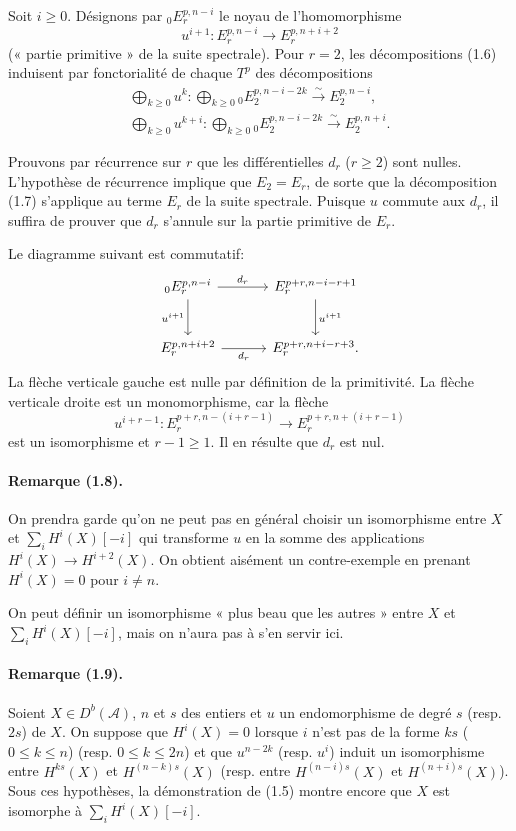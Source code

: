 \documentclass[10pt]{article}
\newcommand{\Acal}{\mathcal A}
\newcommand{\Db}{D^b}
\newcommand{\iso}{\xrightarrow{\sim}}
\begin{document}
Soit $i\ge0$. Désignons par ${}_0E_r^{p,n-i}$ le noyau de l'homomorphisme
\[
u^{i+1}:E_r^{p,n-i}\longrightarrow E_r^{p,n+i+2}
\]
(« partie primitive » de la suite spectrale). Pour $r=2$, les décompositions (1.6) induisent par fonctorialité de chaque $T^p$ des décompositions
\[
\tag{1.7}
\begin{gathered}
\bigoplus_{k\ge0}u^k:\bigoplus_{k\ge0}{}_0E_2^{p,n-i-2k}\iso E_2^{p,n-i},\\
\bigoplus_{k\ge0}u^{k+i}:\bigoplus_{k\ge0}{}_0E_2^{p,n-i-2k}\iso E_2^{p,n+i}.
\end{gathered}
\]

Prouvons par récurrence sur $r$ que les différentielles $d_r$ ($r\ge2$) sont nulles. L'hypothèse de récurrence implique que $E_2=E_r$, de sorte que la décomposition (1.7) s'applique au terme $E_r$ de la suite spectrale. Puisque $u$ commute aux $d_r$, il suffira de prouver que $d_r$ s'annule sur la partie primitive de $E_r$.

Le diagramme suivant est commutatif:
\[
\begin{tikzcd}[column sep=3.2em,row sep=2.6em]
{}_0E_r^{p,n-i} \arrow[r,"d_r"] \arrow[d,"u^{i+1}"'] & E_r^{p+r,n-i-r+1} \arrow[d,"u^{i+1}"]\\
E_r^{p,n+i+2} \arrow[r,"d_r"'] & E_r^{p+r,n+i-r+3}.
\end{tikzcd}
\]
La flèche verticale gauche est nulle par définition de la primitivité. La flèche verticale droite est un monomorphisme, car la flèche
\[
u^{i+r-1}:E_r^{p+r,n-(i+r-1)}\longrightarrow E_r^{p+r,n+(i+r-1)}
\]
est un isomorphisme et $r-1\ge1$. Il en résulte que $d_r$ est nul.

\paragraph{Remarque (1.8).} On prendra garde qu'on ne peut pas en général choisir un isomorphisme entre $X$ et $\sum_iH^i(X)[-i]$ qui transforme $u$ en la somme des applications $H^i(X)\to H^{i+2}(X)$. On obtient aisément un contre-exemple en prenant $H^i(X)=0$ pour $i\ne n$.

On peut définir un isomorphisme « plus beau que les autres » entre $X$ et $\sum_iH^i(X)[-i]$, mais on n'aura pas à s'en servir ici.

\paragraph{Remarque (1.9).} Soient $X\in\Db(\Acal)$, $n$ et $s$ des entiers et $u$ un endomorphisme de degré $s$ (resp. $2s$) de $X$. On suppose que $H^i(X)=0$ lorsque $i$ n'est pas de la forme $ks$ ($0\le k\le n$) (resp. $0\le k\le2n$) et que $u^{n-2k}$ (resp. $u^i$) induit un isomorphisme entre $H^{ks}(X)$ et $H^{(n-k)s}(X)$ (resp. entre $H^{(n-i)s}(X)$ et $H^{(n+i)s}(X)$). Sous ces hypothèses, la démonstration de (1.5) montre encore que $X$ est isomorphe à $\sum_iH^i(X)[-i]$.
\end{document}
